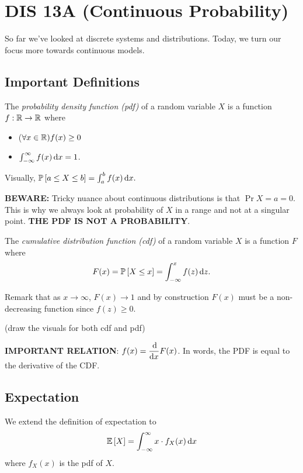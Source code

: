 \section{DIS 13A (Continuous Probability)}

So far we've looked at discrete systems and distributions. Today, we turn our focus more towards continuous models. 

\subsection{Important Definitions}

\begin{definition}
    The \textit{probability density function (pdf)} of a random variable $X$ is a function $f: \operatorname{\mathbb{R}} \to \operatorname{\mathbb{R}}$ where \begin{itemize}
        \item ($\forall x \in \operatorname{\mathbb{R}}) f(x) \ge 0$
        \item $\int_{-\infty}^{\infty} f(x) \operatorname{d\!} x = 1$.
    \end{itemize}
\end{definition}

Visually, $\mathbb{P}\left[ a \le X \le b \right] = \int_{a}^{b} f(x) \operatorname{d\!} x.$

\textbf{BEWARE:} Tricky nuance about continuous distributions is that $\Pr{X = a} = 0$. This is why we always look at probability of $X$ in a range and not at a singular point. \textbf{THE PDF IS NOT A PROBABILITY}.

\begin{definition}
    The \textit{cumulative distribution function (cdf)} of a random variable $X$ is a function $F$ where \[ F(x) = \mathbb{P}\left[ X \le x \right] = \int_{-\infty}^{x} f(z) \operatorname{d\!} z. \]
\end{definition}

Remark that as $x \to \infty$, $F(x) \to 1$ and by construction $F(x)$ must be a non-decreasing function since $f(z) \ge 0$. 

(draw the visuals for both cdf and pdf)

\textbf{IMPORTANT RELATION}: $\displaystyle f(x) = \frac{\operatorname{d\!}}{\operatorname{d\!} x} F(x)$. In words, the PDF is equal to the derivative of the CDF. 

\subsection{Expectation}
We extend the definition of expectation to \[ \mathbb{E}\left[ X \right] = \int_{-\infty}^{\infty} x \cdot f_{X}(x) \operatorname{d\!} x \] where $f_X(x)$ is the pdf of $X$. 

